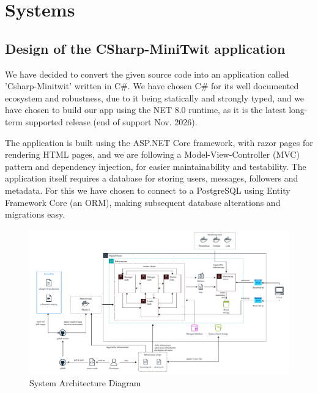\section{Systems}
\subsection{Design of the CSharp-MiniTwit application} \label{Design of the CSharp-MiniTwit application}
We have decided to convert the given source code into an application called 'Csharp-Minitwit' written in C\#. We have chosen C\# for its well documented ecosystem and robustness, due to it being statically and strongly typed, and we have chosen to build our app using the NET 8.0 runtime, as it is the latest long-term supported release (end of support Nov. 2026)\cite{netcoresupport}.

The application is built using the ASP.NET Core framework\cite{aspnetcoreintro2023}, with razor pages for rendering HTML pages, and we are following a Model-View-Controller (MVC) pattern and dependency injection, for easier maintainability and testability.\newline
The application itself requires a database for storing users, messages, followers and metadata. For this we have chosen to connect to a PostgreSQL using Entity Framework Core (an ORM), making subsequent database alterations and migrations easy.\newline


\begin{figure}[ht]
    \centering
    \includegraphics[height=0.8\textwidth, angle=90]{images/figures/devops-architecture-architecture_v2.pdf}
    \caption{System Architecture Diagram}
    \label{fig:architecture}
\end{figure}

